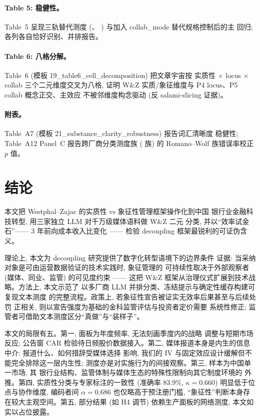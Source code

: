 \paragraph{Table 5: 稳健性。}
Table~5 呈现三轨替代测度 (、
) 与加入 collab\_mode 替代规格控制后的主
回归; 各列各自恰好识别、并排报告。

\paragraph{Table 6: 八格分解。}
Table~6 (模板 19\_table6\_cell\_decomposition) 把文章宇宙按
实质性 $\times$ locus $\times$ collab 三个二元维度交叉为八格,
证明 W\&Z 实质/象征维度与 P4 locus、P5 collab 概念正交、主效应
不被邻维度构念驱动 (反 salami-slicing 证据)。

\paragraph{附表。}
Table~A7 (模板 21\_substance\_clarity\_robustness) 报告词汇清晰度
稳健性; Table~A12 Panel~C 报告跨厂商分类测度族 ( 族)
的 Romano--Wolf 族错误率校正 $p$ 值。

\section{结论}\label{sec:conclusion}

本文把 Westphal--Zajac 的实质性 vs 象征性管理框架操作化到中国
银行业金融科技转型, 用三家独立 LLM 对千万级媒体语料做 W\&Z 二元
分类, 并以``效率试金石''—— 3 年前向成本收入比变化 —— 检验
decoupling 框架最锐利的可证伪含义。

理论上, 本文为 decoupling 研究提供了数字化转型语境下的边界条件
证据: 当采纳对象是可由运营数据验证的技术实践时, 象征管理的
可持续性取决于外部观察者 (媒体、同业、监管) 的可见度约束 ——
这把 W\&Z 框架从治理仪式扩展到技术战略。方法上, 本文示范了
以多厂商 LLM 并排分类、冻结提示与确定性缓存构建可复现文本测度
的完整流程。政策上, 若象征性宣告被证实无效率后果甚至与后续处罚
正相关, 则以宣告强度为基础的金科监管评估与投资者定价需要
系统性修正; 监管者可借助文本测度区分``真做''与``装样子''。

本文的局限有五。第一, 面板为年度频率, 无法刻画季度内的战略
调整与短期市场反应; 公告窗 CAR 检验待日频股价数据接入。第二,
媒体报道本身是内生的信息中介: 报道什么、如何措辞受媒体选择
影响, 我们的 IV 与固定效应设计缓解但不能完全排除这一层内生性;
测度亦是对实施行为的间接观察。第三, 样本为中国单一市场, 其
银行业结构、监管体制与媒体生态的特殊性限制向其它制度环境的
外推。第四, 实质性分类与专家标注的一致性 (准确率 83.9\%, $\kappa = 0.660$)
明显低于位点与协作维度, 编码者间 $\alpha = 0.686$ 也仅略高于预注册门槛,
``象征性''判断本身存在较大主观空间。第五, 部分结果
(如 H4 调节) 依赖生产面板的网络测度, 本文如实以占位披露。

\printbibliography


